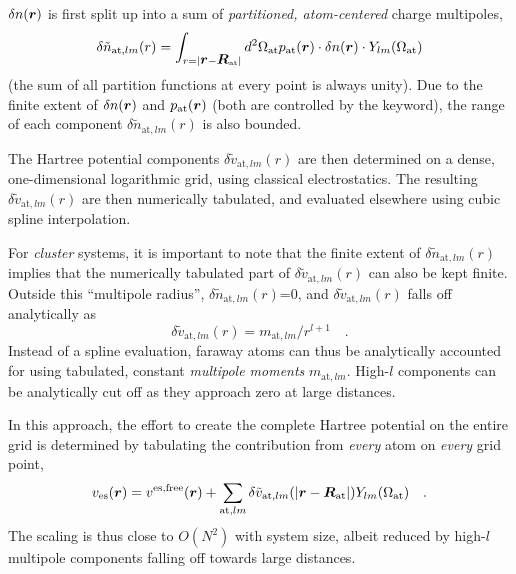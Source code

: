 $\delta n(\mbox{\boldmath$r$})$ is first split up into a sum of \emph{partitioned,
  atom-centered} charge multipoles,
\begin{equation}
  \label{Eq:mp}
  \delta\tilde{n}_{\text{at},lm}(r) =
  \int_{r=|\mbox{\boldmath$r$}-\mbox{\boldmath$R$}_\text{at}|} d^2\Omega_\text{at}
  p_\text{at}(\mbox{\boldmath$r$})\cdot\delta n(\mbox{\boldmath$r$})\cdot Y_{lm}(\Omega_\text{at})
\end{equation}
(the sum of all partition functions at every point is always
unity). Due to the finite extent of $\delta n(\mbox{\boldmath$r$})$ and
$p_\text{at}(\mbox{\boldmath$r$})$ (both are controlled by the
 keyword), the range of each
component $\delta\tilde{n}_{\text{at},lm}(r)$ is also bounded.

The Hartree potential components $\delta\tilde{v}_{\text{at},lm}(r)$
are then determined on a dense, one-dimensional logarithmic grid,
using classical electrostatics. The resulting
$\delta\tilde{v}_{\text{at},lm}(r)$ are then numerically tabulated,
and evaluated elsewhere using cubic spline interpolation.

For \emph{cluster} systems, it is important to note that the finite
extent of $\delta\tilde{n}_{\text{at},lm}(r)$ implies that the
numerically tabulated part of $\delta\tilde{v}_{\text{at},lm}(r)$ can
also be kept finite. Outside this ``multipole radius'',
$\delta\tilde{n}_{\text{at},lm}(r)$=0, and
$\delta\tilde{v}_{\text{at},lm}(r)$ falls off analytically as 
\begin{equation}\label{Eq:moments}
  \delta\tilde{v}_{\text{at},lm}(r) = m_{\text{at},lm}/r^{l+1} \quad .
\end{equation}
Instead of a spline evaluation, faraway atoms can thus be analytically 
accounted for using tabulated, constant \emph{multipole moments}
$m_{\text{at},lm}$. High-$l$ components can be analytically cut off as they
approach zero at large distances. 

In this approach, the effort to create the complete Hartree potential
on the entire grid is determined by tabulating the contribution from
\emph{every} atom on \emph{every} grid point,
\begin{equation}\label{Eq:ves-assembly}
  v_\text{es}(\mbox{\boldmath$r$}) = v^\text{es,free}(\mbox{\boldmath$r$}) + \sum_{\text{at},lm}
  \delta\tilde{v}_{\text{at},lm}(|\mbox{\boldmath$r$}-\mbox{\boldmath$R$}_\text{at}|)
  Y_{lm}(\Omega_\text{at}) \quad .
\end{equation}
The scaling is thus close to $O(N^2)$ with system size, albeit
reduced by high-$l$ multipole components falling off towards large
distances.

